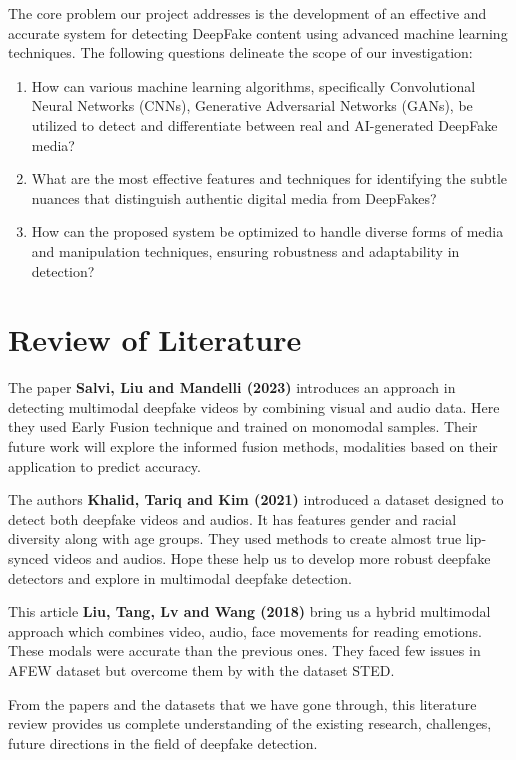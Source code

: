 \documentclass[12pt]{extarticle}
\begin{document}
The core problem our project addresses is the development of an effective and accurate system for detecting DeepFake content using advanced machine learning techniques. The following questions delineate the scope of our investigation:

\begin{enumerate}
    \item How can various machine learning algorithms, specifically Convolutional Neural Networks (CNNs), Generative Adversarial Networks (GANs), be utilized to detect and differentiate between real and AI-generated DeepFake media?
    \item What are the most effective features and techniques for identifying the subtle nuances that distinguish authentic digital media from DeepFakes?
    \item How can the proposed system be optimized to handle diverse forms of media and manipulation techniques, ensuring robustness and adaptability in detection?
\end{enumerate}

\section{Review of Literature}

The paper \textbf{Salvi, Liu and Mandelli (2023)} introduces an approach in detecting multimodal deepfake videos by combining visual and audio data. Here they used Early Fusion technique and trained on monomodal samples. Their future work will explore the informed fusion methods, modalities based on their application to predict accuracy. \cite{jimaging9060122}

The authors \textbf{Khalid, Tariq and Kim (2021)} introduced a dataset designed to detect both deepfake videos and audios. It has features gender and racial diversity along with age groups. They used methods to create almost true lip-synced videos and audios. Hope these help us to develop more robust deepfake detectors and explore in multimodal deepfake detection. \cite{khalid2021evaluation} \\ \cite{khalid2022fakeavceleb}

This article \textbf{Liu, Tang, Lv and Wang (2018)}  bring us a hybrid multimodal approach which combines video, audio, face movements for reading emotions. These modals were accurate than the previous ones. They faced few issues in AFEW dataset but overcome them by with the dataset STED. \cite{liu2018clips}

From the papers and the datasets that we have gone through, this literature review provides us complete understanding of the existing research, challenges, future directions in the field of deepfake detection. \nocite{Chelehchaleh_Salehi_Farahbakhsh_Crespi_2024}
\end{document}
